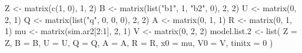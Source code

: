 \begin{Schunk}
\begin{Sinput}
 Z <- matrix(c(1, 0), 1, 2)
 B <- matrix(list("b1", 1, "b2", 0), 2, 2)
 U <- matrix(0, 2, 1)
 Q <- matrix(list("q", 0, 0, 0), 2, 2)
 A <- matrix(0, 1, 1)
 R <- matrix(0, 1, 1)
 mu <- matrix(sim.ar2[2:1], 2, 1)
 V <- matrix(0, 2, 2)
 model.list.2 <- list(
   Z = Z, B = B, U = U, Q = Q, A = A,
   R = R, x0 = mu, V0 = V, tinitx = 0
 )
\end{Sinput}
\end{Schunk}
